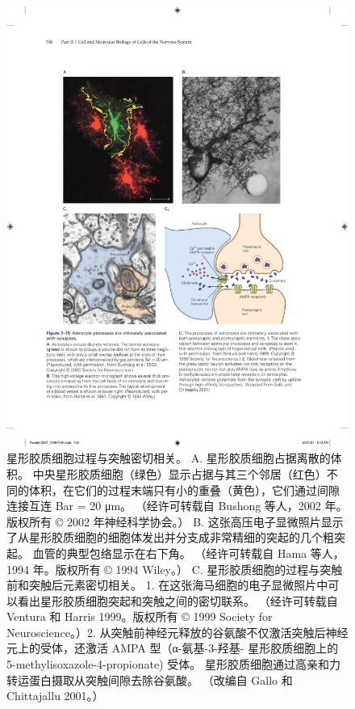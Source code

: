 \begin{figure}[htbp]
	\centering
	\includegraphics[width=1.0\linewidth]{chap07/fig_7_19}
	\caption{星形胶质细胞过程与突触密切相关。 A. 星形胶质细胞占据离散的体积。 中央星形胶质细胞（绿色）显示占据与其三个邻居（红色）不同的体积，在它们的过程末端只有小的重叠（黄色），它们通过间隙连接互连 Bar = 20 μm。 （经许可转载自 Bushong 等人，2002 年。版权所有 © 2002 年神经科学协会。） B. 这张高压电子显微照片显示了从星形胶质细胞的细胞体发出并分支成非常精细的突起的几个粗突起。 血管的典型包络显示在右下角。 （经许可转载自 Hama 等人，1994 年。版权所有 © 1994 Wiley。） C. 星形胶质细胞的过程与突触前和突触后元素密切相关。 1. 在这张海马细胞的电子显微照片中可以看出星形胶质细胞突起和突触之间的密切联系。 （经许可转载自 Ventura 和 Harris 1999。版权所有 © 1999 Society for Neuroscience。）2. 从突触前神经元释放的谷氨酸不仅激活突触后神经元上的受体，还激活 AMPA 型（α-氨基-3-羟基- 星形胶质细胞上的 5-methylisoxazole-4-propionate) 受体。 星形胶质细胞通过高亲和力转运蛋白摄取从突触间隙去除谷氨酸。 （改编自 Gallo 和 Chittajallu 2001。）}
	\label{fig:7_19}
\end{figure}


